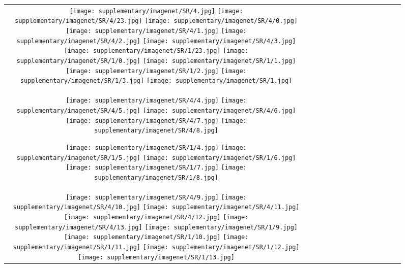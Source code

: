 \begin{figure*}[tb!]
    \centering
    \setlength{\tabcolsep}{0.5pt}
    {\small
    \renewcommand{\arraystretch}{0.5} 
    \begin{tabular}{c c c c c c c c c c c c c c }
    \captionsetup{type=figure, font=scriptsize}
  \texttt{[image: supplementary/imagenet/SR/4.jpg]}
  \texttt{[image: supplementary/imagenet/SR/4/23.jpg]}
  \texttt{[image: supplementary/imagenet/SR/4/0.jpg]}
  \texttt{[image: supplementary/imagenet/SR/4/1.jpg]}
  \texttt{[image: supplementary/imagenet/SR/4/2.jpg]}
  \texttt{[image: supplementary/imagenet/SR/4/3.jpg]}
    \hspace{5mm}
  \texttt{[image: supplementary/imagenet/SR/1/23.jpg]}
  \texttt{[image: supplementary/imagenet/SR/1/0.jpg]}
  \texttt{[image: supplementary/imagenet/SR/1/1.jpg]}
  \texttt{[image: supplementary/imagenet/SR/1/2.jpg]}
  \texttt{[image: supplementary/imagenet/SR/1/3.jpg]}
  \texttt{[image: supplementary/imagenet/SR/1.jpg]}

 \tabularnewline
  \texttt{[image: supplementary/imagenet/SR/4/4.jpg]}
  \texttt{[image: supplementary/imagenet/SR/4/5.jpg]}
  \texttt{[image: supplementary/imagenet/SR/4/6.jpg]}
  \texttt{[image: supplementary/imagenet/SR/4/7.jpg]}
  \texttt{[image: supplementary/imagenet/SR/4/8.jpg]}
    \hspace{5mm}
    
  \texttt{[image: supplementary/imagenet/SR/1/4.jpg]}
  \texttt{[image: supplementary/imagenet/SR/1/5.jpg]}
  \texttt{[image: supplementary/imagenet/SR/1/6.jpg]}
  \texttt{[image: supplementary/imagenet/SR/1/7.jpg]}
  \texttt{[image: supplementary/imagenet/SR/1/8.jpg]}
\tabularnewline
  \texttt{[image: supplementary/imagenet/SR/4/9.jpg]}
  \texttt{[image: supplementary/imagenet/SR/4/10.jpg]}
  \texttt{[image: supplementary/imagenet/SR/4/11.jpg]}
  \texttt{[image: supplementary/imagenet/SR/4/12.jpg]}
  \texttt{[image: supplementary/imagenet/SR/4/13.jpg]}
    \hspace{5mm}
  \texttt{[image: supplementary/imagenet/SR/1/9.jpg]}
  \texttt{[image: supplementary/imagenet/SR/1/10.jpg]}
  \texttt{[image: supplementary/imagenet/SR/1/11.jpg]}
  \texttt{[image: supplementary/imagenet/SR/1/12.jpg]}
  \texttt{[image: supplementary/imagenet/SR/1/13.jpg]}


\end{tabular}}
\end{figure*}
